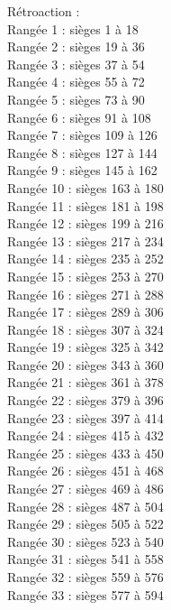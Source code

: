 ﻿\documentclass[letterpaper, 12pt]{article}
\begin{document}
R\'etroaction : \\
Rang\'ee 1 : si\`eges 1 \`a 18\\
Rang\'ee 2 : si\`eges 19 \`a 36\\
Rang\'ee 3 : si\`eges 37 \`a 54\\
Rang\'ee 4 : si\`eges 55 \`a 72\\
Rang\'ee 5 : si\`eges 73 \`a 90\\
Rang\'ee 6 : si\`eges 91 \`a 108\\
Rang\'ee 7 : si\`eges 109 \`a 126\\
Rang\'ee 8 : si\`eges 127 \`a 144\\
Rang\'ee 9 : si\`eges 145 \`a 162\\
Rang\'ee 10 : si\`eges 163 \`a 180\\
Rang\'ee 11 : si\`eges 181 \`a 198\\
Rang\'ee 12 : si\`eges 199 \`a 216\\
Rang\'ee 13 : si\`eges 217 \`a 234\\
Rang\'ee 14 : si\`eges 235 \`a 252\\
Rang\'ee 15 : si\`eges 253 \`a 270\\
Rang\'ee 16 : si\`eges 271 \`a 288\\
Rang\'ee 17 : si\`eges 289 \`a 306\\
Rang\'ee 18 : si\`eges 307 \`a 324\\
Rang\'ee 19 : si\`eges 325 \`a 342\\
Rang\'ee 20 : si\`eges 343 \`a 360\\
Rang\'ee 21 : si\`eges 361 \`a 378\\
Rang\'ee 22 : si\`eges 379 \`a 396\\
Rang\'ee 23 : si\`eges 397 \`a 414\\
Rang\'ee 24 : si\`eges 415 \`a 432\\
Rang\'ee 25 : si\`eges 433 \`a 450\\
Rang\'ee 26 : si\`eges 451 \`a 468\\
Rang\'ee 27 : si\`eges 469 \`a 486\\
Rang\'ee 28 : si\`eges 487 \`a 504\\
Rang\'ee 29 : si\`eges 505 \`a 522\\
Rang\'ee 30 : si\`eges 523 \`a 540\\
Rang\'ee 31 : si\`eges 541 \`a 558\\
Rang\'ee 32 : si\`eges 559 \`a 576\\
Rang\'ee 33 : si\`eges 577 \`a 594\\
\end{document}
